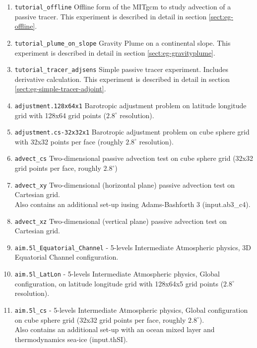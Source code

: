 \begin{enumerate}
\item \texttt{tutorial\_offline} Offline form of the MITgcm to study
  advection of a passive tracer.  This experiment is described in
  detail in section \ref{sect:eg-offline}.

\item \texttt{tutorial\_plume\_on\_slope} Gravity Plume on a
  continental slope.  This experiment is described in detail in
  section \ref{sect:eg-gravityplume}.

\item \texttt{tutorial\_tracer\_adjsens} Simple passive tracer
  experiment. Includes derivative calculation. This experiment is
  described in detail in section \ref{sect:eg-simple-tracer-adjoint}.

\item \texttt{adjustment.128x64x1} Barotropic adjustment problem on
  latitude longitude grid with 128x64 grid points ($2.8^\circ$ resolution).
  
\item \texttt{adjustment.cs-32x32x1} Barotropic adjustment problem on
  cube sphere grid with 32x32 points per face (roughly $2.8^\circ$
  resolution).
  
\item \texttt{advect\_cs} Two-dimensional passive advection test on
  cube sphere grid (32x32 grid points per face, roughly $2.8^\circ$)
  
\item \texttt{advect\_xy} Two-dimensional (horizontal plane) passive
  advection test on Cartesian grid.\\
  Also contains an additional set-up iusing Adams-Bashforth 3 (input.ab3\_c4).
  
\item \texttt{advect\_xz} Two-dimensional (vertical plane) passive
  advection test on Cartesian grid.
  
\item \texttt{aim.5l\_Equatorial\_Channel}
  - 5-levels Intermediate Atmospheric physics, 
  3D Equatorial Channel configuration.
  
\item \texttt{aim.5l\_LatLon} - 5-levels Intermediate Atmospheric physics,
  Global configuration, on latitude longitude grid with 128x64x5 grid
  points ($2.8^\circ$ resolution).
  
\item \texttt{aim.5l\_cs} - 5-levels Intermediate Atmospheric physics,
  Global configuration on cube sphere grid 
  (32x32 grid points per face, roughly $2.8^\circ$).\\
  Also contains an additional set-up with an ocean mixed layer and thermodynamics
  sea-ice (input.thSI).


\end{enumerate}
